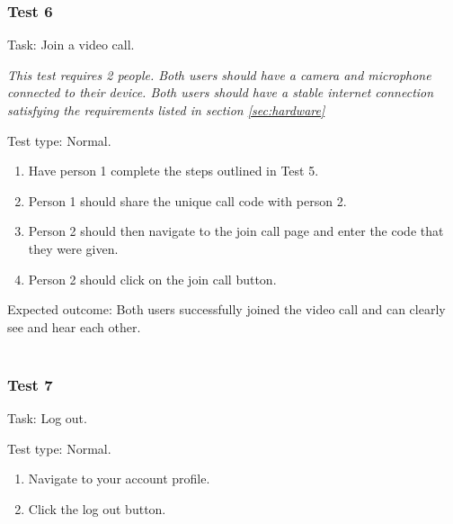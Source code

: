 {\color{gray} \hrulefill}

\vspace{0.2cm}

\subsubsection{Test 6}

{\sffamily Task:} Join a video call.\\ \vspace{0.2cm}

\textit{This test requires 2 people. Both users should have a camera
and microphone connected to their device. Both users should have a
stable internet connection satisfying the requirements listed in section \ref{sec:hardware}}\\

{\color{gray} \hrulefill}

{\sffamily Test type: Normal.}\\

\begin{enumerate}
  \item Have person 1 complete the steps outlined in Test 5.
  \item Person 1 should share the unique call code with person 2.
  \item Person 2 should then navigate to the join call page and enter the code that they were given.
  \item Person 2 should click on the join call button.
\end{enumerate}

{\sffamily Expected outcome:} Both users successfully joined the video call
and can clearly see and hear each other.\\

{\color{gray} \hrulefill} \\

\subsubsection{Test 7}

{\sffamily Task:} Log out.\\

{\color{gray} \hrulefill}

{\sffamily Test type: Normal.}\\

\begin{enumerate}
  \item Navigate to your account profile.
  \item Click the log out button.
\end{enumerate}

